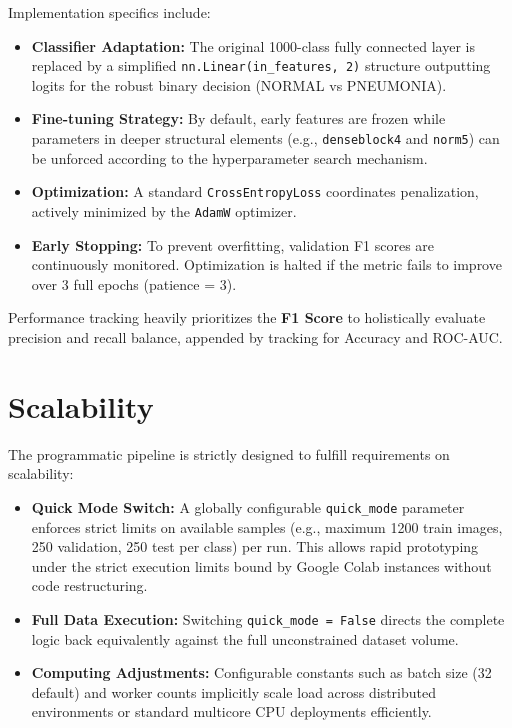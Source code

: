 \documentclass[orivec]{llncs}
\begin{document}
Implementation specifics include:
\begin{itemize}
    \item \textbf{Classifier Adaptation:} The original 1000-class fully connected layer is replaced by a simplified \texttt{nn.Linear(in\_features, 2)} structure outputting logits for the robust binary decision (NORMAL vs PNEUMONIA).
    \item \textbf{Fine-tuning Strategy:} By default, early features are frozen while parameters in deeper structural elements (e.g., \texttt{denseblock4} and \texttt{norm5}) can be unforced according to the hyperparameter search mechanism.
    \item \textbf{Optimization:} A standard \texttt{CrossEntropyLoss} coordinates penalization, actively minimized by the \texttt{AdamW} optimizer.
    \item \textbf{Early Stopping:} To prevent overfitting, validation F1 scores are continuously monitored. Optimization is halted if the metric fails to improve over 3 full epochs (patience = 3).
\end{itemize}
Performance tracking heavily prioritizes the \textbf{F1 Score} to holistically evaluate precision and recall balance, appended by tracking for Accuracy and ROC-AUC. 

\section{Scalability}
The programmatic pipeline is strictly designed to fulfill requirements on scalability:
\begin{itemize}
    \item \textbf{Quick Mode Switch:} A globally configurable \texttt{quick\_mode} parameter enforces strict limits on available samples (e.g., maximum 1200 train images, 250 validation, 250 test per class) per run. This allows rapid prototyping under the strict execution limits bound by Google Colab instances without code restructuring. 
    \item \textbf{Full Data Execution:} Switching \texttt{quick\_mode = False} directs the complete logic back equivalently against the full unconstrained dataset volume.
    \item \textbf{Computing Adjustments:} Configurable constants such as batch size (32 default) and worker counts implicitly scale load across distributed environments or standard multicore CPU deployments efficiently.
\end{itemize}
\end{document}
